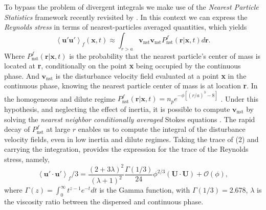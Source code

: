 \documentclass[12pt,a4paper]{article}
\newcommand{\avg}[1]{\left<#1\right>}
\renewcommand{\avg}[1]{\left<#1\right>}
\begin{document}
To bypass the problem of divergent integrals we make use of the  \textit{Nearest Particle Statistics} framework recently revisited by \cite{zhang2021ensemble}. 
In this context we can express the \textit{Reynolds stress} in terms of nearest-particles averaged quantities, which yields
\begin{equation}
    \avg{\textbf{u}'\textbf{u}'}_f(\textbf{x},t)
    \approx
    \int_{r >a}  \textbf{v}_\text{nst}  \textbf{v}_\text{nst} P_\text{nst}^f(\textbf{r}|\textbf{x},t) d\textbf{r}.
    \label{eq:eq2}
\end{equation}
Where $P_\text{nst}^f(\textbf{r}|\textbf{x},t)$ is the probability that the nearest particle's center of mass is located at \textbf{r}, conditionally on the point \textbf{x} being occupied by the continuous phase.
And $\textbf{v}_\text{nst}$ is the disturbance velocity field evaluated at a point \textbf{x} in the continuous phase, knowing the nearest particle center of mass is at location \textbf{r}. 
In the homogeneous and dilute regime $P_\text{nst}^f(\textbf{r}|\textbf{x},t) = n_p e^{- \phi [(r/a)^3 - 8]}$ \cite{zhang2021ensemble}.
Under this hypothesis, and neglecting the effect of inertia, it is possible to compute $\textbf{v}_\text{nst}$ by solving the \textit{nearest neighbor conditionally averaged} Stokes equations \cite{zhang2021ensemble}. 
The rapid decay of $P_\text{nst}^f$ at large $r$ enables us to compute the integral of the disturbance velocity fields, even in low inertia and dilute regimes. 
Taking the trace of (2) and carrying the integration, provides the expression for the trace of the Reynolds stress, namely,
\begin{equation}
    \avg{\textbf{u}'\cdot \textbf{u}'}_f/3
    = \frac{(2+3\lambda)^2}{(\lambda+1)^2}\frac{\Gamma(1/3)}{24} 
        \phi^{2/3}
        (\textbf{U}\cdot \textbf{U})
        + \mathcal{O}(\phi),
        \label{eq:results}
\end{equation}
where $\Gamma(z) = \int_0^\infty t^{z-1} e^{-t} dt$ is the Gamma function, with $\Gamma(1/3)= 2.678$, $\lambda$ is the viscosity ratio between the dispersed and continuous phase.
\end{document}
